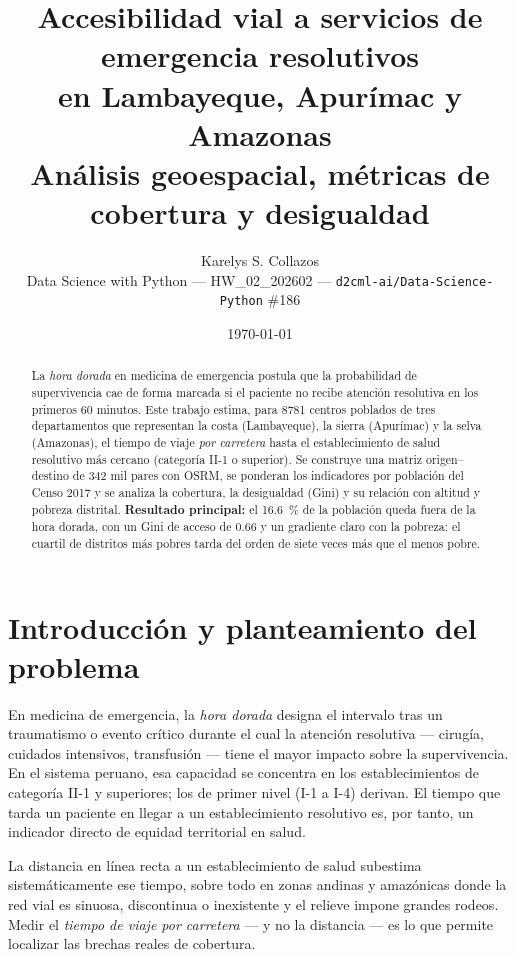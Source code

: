 \documentclass[11pt,a4paper]{article}
\title{\textbf{Accesibilidad vial a servicios de emergencia resolutivos\\
en Lambayeque, Apur\'imac y Amazonas}\\[0.3em]
\large An\'alisis geoespacial, m\'etricas de cobertura y desigualdad}
\author{Karelys S. Collazos \\
\small Data Science with Python --- HW\_02\_202602 --- \texttt{d2cml-ai/Data-Science-Python} \#186}
\date{\today}
\begin{document}
\maketitle

\begin{abstract}
\noindent
La \emph{hora dorada} en medicina de emergencia postula que la probabilidad de
supervivencia cae de forma marcada si el paciente no recibe atenci\'on
resolutiva en los primeros 60 minutos. Este trabajo estima, para
\num{8781} centros poblados de tres departamentos que representan la costa
(Lambayeque), la sierra (Apur\'imac) y la selva (Amazonas), el tiempo de viaje
\emph{por carretera} hasta el establecimiento de salud resolutivo m\'as cercano
(categor\'ia II-1 o superior). Se construye una matriz origen--destino de
\num{342} mil pares con OSRM, se ponderan los indicadores por poblaci\'on del
Censo 2017 y se analiza la cobertura, la desigualdad (Gini) y su relaci\'on con
altitud y pobreza distrital. \textbf{Resultado principal:} el
\SI{16.6}{\percent} de la poblaci\'on queda fuera de la hora dorada, con un Gini
de acceso de \num{0.66} y un gradiente claro con la pobreza: el cuartil de
distritos m\'as pobres tarda del orden de siete veces m\'as que el menos pobre.
\end{abstract}

\section{Introducci\'on y planteamiento del problema}

En medicina de emergencia, la \emph{hora dorada} designa el intervalo tras un
traumatismo o evento cr\'itico durante el cual la atenci\'on resolutiva
--- cirug\'ia, cuidados intensivos, transfusi\'on --- tiene el mayor impacto
sobre la supervivencia. En el sistema peruano, esa capacidad se concentra en
los establecimientos de categor\'ia II-1 y superiores; los de primer nivel
(I-1 a I-4) derivan. El tiempo que tarda un paciente en llegar a un
establecimiento resolutivo es, por tanto, un indicador directo de equidad
territorial en salud.

La distancia en l\'inea recta a un establecimiento de salud subestima
sistem\'aticamente ese
tiempo, sobre todo en zonas andinas y amaz\'onicas donde la red vial es
sinuosa, discontinua o inexistente y el relieve impone grandes rodeos. Medir
el \emph{tiempo de viaje por carretera} --- y no la distancia --- es lo que
permite localizar las brechas reales de cobertura.
\end{document}

